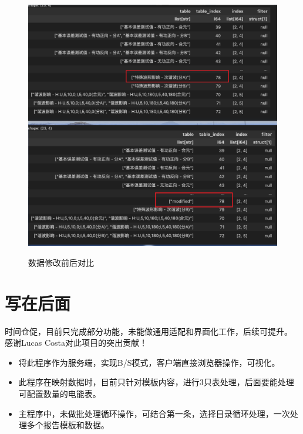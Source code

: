 \begin{figure}[H]
    \begin{center}
        \includegraphics[width=.95\linewidth]{res/modify.png}\\
        \caption{数据修改前后对比}\label{modify}
    \end{center}
\end{figure}

\section{写在后面}

时间仓促，目前只完成部分功能，未能做通用适配和界面化工作，后续可提升。
感谢Lucas Costa对此项目的突出贡献！

    \begin{itemize}
        \item 将此程序作为服务端，实现B/S模式，客户端直接浏览器操作，可视化。
        \item 此程序在映射数据时，目前只针对模板内容，进行3只表处理，后面要能处理可配置数量的电能表。 
        \item 主程序中，未做批处理循环操作，可结合第一条，选择目录循环处理，一次处理多个报告模板和数据。
    \end{itemize}

